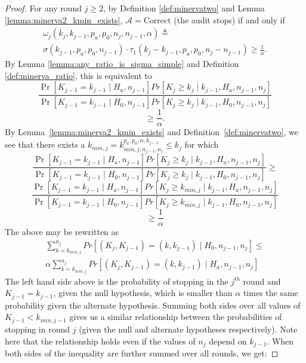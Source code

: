 \begin{proof}
For any round $j\ge 2$, by Definition \ref{def:minervatwo}
and Lemma \ref{lemma:minerva2_kmin_exists},
$\mathcal{A}=\text{Correct}$ (the audit stops) if and only if
\begin{equation*}
\begin{aligned}
\omega_{j}(k_{j}, k_{j-1}, p_a, p_0, n_{j}, n_{j-1}, \alpha )\triangleq\\
\sigma(k_{j-1},p_a,p_0,n_{j-1})\cdot \tau_1(k_{j}-k_{j-1},p_a,p_0,n_j-n_{j-1})
\ge \frac{1}{\alpha}.
\end{aligned}
\end{equation*}
By Lemma \ref{lemma:any_ratio_is_sigma_simple}
and Definition \ref{def:minerva_ratio}, this is equivalent to
$$
\frac{\Pr[K_{j-1} = {k_{j-1}} \mid H_a, n_{j-1}] Pr[K_{j} \ge k_{j} \mid {k_{j-1}}, H_a, n_{j-1}, n_{j}]}{\Pr[K_{j-1} = {k_{j-1}} \mid H_0, n_{j-1}] Pr[K_{j} \ge k_{j} \mid {k_{j-1}}, H_0, n_{j-1}, n_{j}]}
$$$$\ge \frac{1}{\alpha}.
$$
By Lemma~\ref{lemma:minerva2_kmin_exists} and Definition~\ref{def:minervatwo},
we see that there exists a $k_{min, j} = k^{p_a, p_0, \alpha, k_{j-1}}_{min, j, n_{j-1}, n_j}  \leq k_j$ 
for which
$$
\frac{\Pr[K_{j-1} = {k_{j-1}} \mid H_a, n_{j-1}] Pr[K_{j} \ge k_{j} \mid {k_{j-1}}, H_a, n_{j-1}, n_{j}]}{\Pr[K_{j-1} = {k_{j-1}} \mid H_0, n_{j-1}] Pr[K_{j} \ge k_{j} \mid {k_{j-1}}, H_0, n_{j-1}, n_{j}]}\ge
$$
$$
\frac{\Pr[K_{j-1} = {k_{j-1}} \mid H_a, n_{j-1}] Pr[K_{j} \ge k_{min, j} \mid {k_{j-1}}, H_a, n_{j-1}, n_{j}]}{\Pr[K_{j-1} = {k_{j-1}} \mid H_0, n_{j-1}] Pr[K_{j} \ge k_{min, j} \mid {k_{j-1}}, H_0, n_{j-1}, n_{j}]} 
$$$$
\ge 
\frac{1}{\alpha}
$$
The above may be rewritten as
\begin{equation*}
\begin{aligned}
\sum_{{k} = k_{min, j}}^{n_j} Pr[(K_{j} , K_{j-1}) = (k, k_{j-1}) \mid H_0, n_{j-1}, n_{j}] \leq \\
\alpha \sum_{{k} = k_{min, j}}^{n_j} Pr[(K_{j} , K_{j-1}) = (k, k_{j-1}) \mid H_a, n_{j-1}, n_{j}]
\end{aligned}
\end{equation*}
The left hand side above is the probability of stopping in the $j^{th}$ round and $K_{j-1} = k_{j-1}$, given the null hypothesis, which is smaller than $\alpha$ times the same probability given the alternate hypothesis. Summing both sides over all values of $K_{j-1} < k_{min, j-1}$ gives us a similar relationship between the probabilities of stopping in round $j$ (given the null and alternate hypotheses respectively). Note here that the relationship holds even if the values of $n_{j}$ depend on $k_{j-1}$. When both sides of the inequality are further summed over all rounds, we get:  


\end{proof}
